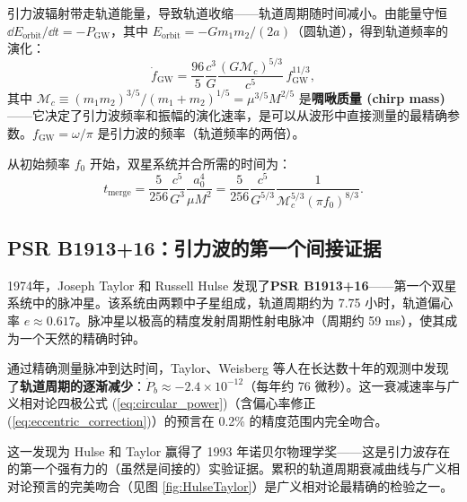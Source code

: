 引力波辐射带走轨道能量，导致轨道收缩——轨道周期随时间减小。由能量守恒 $\dd E_{\text{orbit}}/\dd t = -P_{\text{GW}}$，其中 $E_{\text{orbit}} = -Gm_1m_2/(2a)$（圆轨道），得到轨道频率的演化：
\begin{equation}
    \boxed{\dot{f}_{\text{GW}} = \frac{96}{5}\frac{c^3}{G}\frac{(G\mathcal{M}_c)^{5/3}}{c^5}\, f_{\text{GW}}^{11/3}},
    \label{eq:chirp}
\end{equation}
其中 $\mathcal{M}_c \equiv (m_1m_2)^{3/5}/(m_1+m_2)^{1/5} = \mu^{3/5}M^{2/5}$ 是\textbf{啁啾质量 (chirp mass)}——它决定了引力波频率和振幅的演化速率，是可以从波形中直接测量的最精确参数。$f_{\text{GW}} = \omega/\pi$ 是引力波的频率（轨道频率的两倍）。

\begin{property}[并合时间]
从初始频率 $f_0$ 开始，双星系统并合所需的时间为：
\begin{equation}
    t_{\text{merge}} = \frac{5}{256}\frac{c^5}{G^3}\frac{a_0^4}{\mu M^2}
    = \frac{5}{256}\frac{c^5}{G^{5/3}}\frac{1}{\mathcal{M}_c^{5/3}(\pi f_0)^{8/3}}.
    \label{eq:merger_time}
\end{equation}
\end{property}

\subsection{PSR B1913+16：引力波的第一个间接证据}

\begin{note}
1974年，Joseph Taylor 和 Russell Hulse 发现了\textbf{PSR B1913+16}——第一个双星系统中的脉冲星。该系统由两颗中子星组成，轨道周期约为 7.75 小时，轨道偏心率 $e \approx 0.617$。脉冲星以极高的精度发射周期性射电脉冲（周期约 59 ms），使其成为一个天然的精确时钟。

通过精确测量脉冲到达时间，Taylor、Weisberg 等人在长达数十年的观测中发现了\textbf{轨道周期的逐渐减少}：$\dot{P}_b \approx -2.4 \times 10^{-12}$（每年约 76 微秒）。这一衰减速率与广义相对论四极公式 (\ref{eq:circular_power})（含偏心率修正 (\ref{eq:eccentric_correction})）的预言在 0.2\% 的精度范围内完全吻合。

这一发现为 Hulse 和 Taylor 赢得了 1993 年诺贝尔物理学奖——这是引力波存在的第一个强有力的（虽然是间接的）实验证据。累积的轨道周期衰减曲线与广义相对论预言的完美吻合（见图 \ref{fig:HulseTaylor}）是广义相对论最精确的检验之一。
\end{note}


